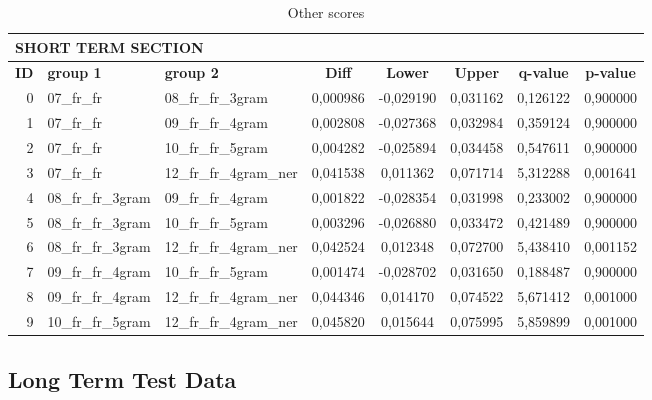 \begin{table}[h!]
    \centering
    \caption{Other scores} %
    \label{tab:st_comparison}
    \begin{tabular}{|r|l|l||c|c|c|c|c|}
        \hline
        \multicolumn{8}{|l|}{\textbf{SHORT TERM SECTION}} \\ \hline\hline
        \textbf{ID} & \textbf{group 1} & \textbf{group 2} & \textbf{Diff} & \textbf{Lower} & \textbf{Upper} & \textbf{q-value} & \textbf{p-value} \\ \hline
        0 & 07\_fr\_fr & 08\_fr\_fr\_3gram & 0,000986 & -0,029190 & 0,031162 & 0,126122 & 0,900000 \\ \hline
        1 & 07\_fr\_fr & 09\_fr\_fr\_4gram & 0,002808 & -0,027368 & 0,032984 & 0,359124 & 0,900000 \\ \hline
        2 & 07\_fr\_fr & 10\_fr\_fr\_5gram & 0,004282 & -0,025894 & 0,034458 & 0,547611 & 0,900000 \\ \hline
        3 & 07\_fr\_fr & 12\_fr\_fr\_4gram\_ner & 0,041538 & 0,011362 & 0,071714 & 5,312288 & 0,001641 \\ \hline
        4 & 08\_fr\_fr\_3gram & 09\_fr\_fr\_4gram & 0,001822 & -0,028354 & 0,031998 & 0,233002 & 0,900000 \\ \hline
        5 & 08\_fr\_fr\_3gram & 10\_fr\_fr\_5gram & 0,003296 & -0,026880 & 0,033472 & 0,421489 & 0,900000 \\ \hline
        6 & 08\_fr\_fr\_3gram & 12\_fr\_fr\_4gram\_ner & 0,042524 & 0,012348 & 0,072700 & 5,438410 & 0,001152 \\ \hline
        7 & 09\_fr\_fr\_4gram & 10\_fr\_fr\_5gram & 0,001474 & -0,028702 & 0,031650 & 0,188487 & 0,900000 \\ \hline
        8 & 09\_fr\_fr\_4gram & 12\_fr\_fr\_4gram\_ner & 0,044346 & 0,014170 & 0,074522 & 5,671412 & 0,001000 \\ \hline
        9 & 10\_fr\_fr\_5gram & 12\_fr\_fr\_4gram\_ner & 0,045820 & 0,015644 & 0,075995 & 5,859899 & 0,001000 \\ \hline\hline
    \end{tabular}
\end{table}

\subsection{Long Term Test Data}\label{subsec:long_term}


